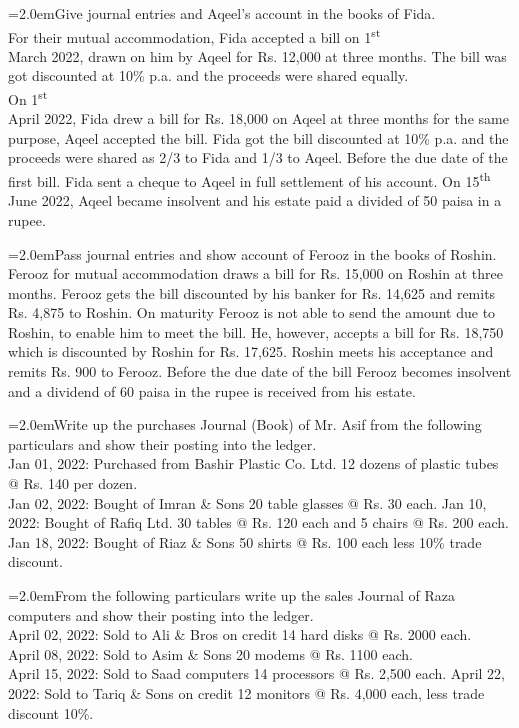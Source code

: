 \documentclass[11pt,a4paper]{article}
\newcommand{\lqn}[2]{\Needspace{6\baselineskip}\par\medskip\noindent\hangindent=2.0em\hangafter=1\makebox[2.0em][l]{\textbf{#1.}}#2\par}
\begin{document}
\lqn{51}{Give journal entries and Aqeel’s account in the books of Fida.\\
For their mutual accommodation, Fida accepted a bill on 1\textsuperscript{st}\\
March 2022, drawn on him by Aqeel for Rs. 12,000 at three months. The bill was got discounted at 10\% p.a. and the proceeds were shared equally.\\
On 1\textsuperscript{st}\\
April 2022, Fida drew a bill for Rs. 18,000 on Aqeel at three months for the same purpose, Aqeel accepted the bill. Fida got the bill discounted at 10\% p.a. and the proceeds were shared as 2/3 to Fida and 1/3 to Aqeel. Before the due date of the first bill. Fida sent a cheque to Aqeel in full settlement of his account. On 15\textsuperscript{th}\\
June 2022, Aqeel became insolvent and his estate paid a divided of 50 paisa in a rupee.\par
}
\lqn{52}{Pass journal entries and show account of Ferooz in the books of Roshin. Ferooz for mutual accommodation draws a bill for Rs. 15,000 on Roshin at three months. Ferooz gets the bill discounted by his banker for Rs. 14,625 and remits Rs. 4,875 to Roshin. On maturity Ferooz is not able to send the amount due to Roshin, to enable him to meet the bill. He, however, accepts a bill for Rs. 18,750 which is discounted by Roshin for Rs. 17,625. Roshin meets his acceptance and remits Rs. 900 to Ferooz. Before the due date of the bill Ferooz becomes insolvent and a dividend of 60 paisa in the rupee is received from his estate.\par
}
\lqn{53}{Write up the purchases Journal (Book) of Mr. Asif from the following particulars and show their posting into the ledger.\\
Jan 01, 2022:    Purchased from Bashir Plastic Co. Ltd. 12 dozens of plastic tubes @ Rs. 140 per dozen.\\
Jan 02, 2022:    Bought of Imran \& Sons 20 table glasses @ Rs. 30 each. Jan 10, 2022:    Bought of Rafiq Ltd. 30 tables @ Rs. 120 each and 5 chairs @ Rs. 200 each.\\
Jan 18, 2022:    Bought of Riaz \& Sons 50 shirts @ Rs. 100 each less 10\% trade discount.\par
}
\lqn{54}{From the following particulars write up the sales Journal of Raza computers and show their posting into the ledger.\\
April 02, 2022:   Sold to Ali \& Bros on credit 14 hard disks @ Rs. 2000 each.\\
April 08, 2022:   Sold to Asim \& Sons 20 modems @ Rs. 1100 each.\\
April 15, 2022:   Sold to Saad computers 14 processors @ Rs. 2,500 each. April 22, 2022:   Sold to Tariq \& Sons on credit 12 monitors @ Rs. 4,000 each, less trade discount 10\%.\par
}
\end{document}
